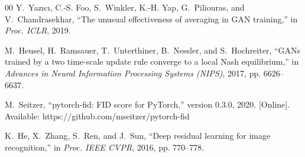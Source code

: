 \documentclass[conference]{IEEEtran}
\begin{document}
\begin{thebibliography}{00}
Y.~Yaz{\i}c{\i}, C.-S. Foo, S.~Winkler, K.-H. Yap, G.~Piliouras, and V.~Chandrasekhar, ``The unusual effectiveness of averaging in GAN training,'' in \emph{Proc. ICLR}, 2019.

M.~Heusel, H.~Ramsauer, T.~Unterthiner, B.~Nessler, and S.~Hochreiter, ``GANs trained by a two time-scale update rule converge to a local Nash equilibrium,'' in \emph{Advances in Neural Information Processing Systems (NIPS)}, 2017, pp. 6626--6637.

M.~Seitzer, ``pytorch-fid: FID score for PyTorch,'' version 0.3.0, 2020. [Online]. Available: https://github.com/mseitzer/pytorch-fid

K.~He, X.~Zhang, S.~Ren, and J.~Sun, ``Deep residual learning for image recognition,'' in \emph{Proc. IEEE CVPR}, 2016, pp. 770--778.
\end{thebibliography}
\end{document}
